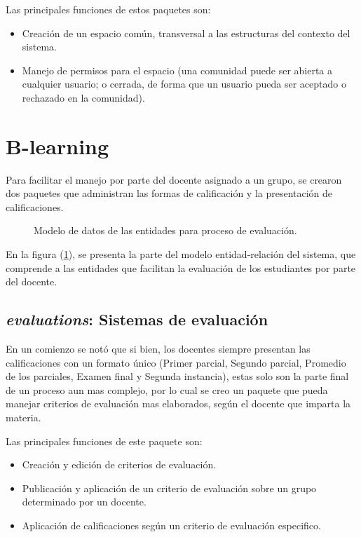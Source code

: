 Las principales funciones de estos paquetes son:

\begin{itemize}
\item Creación de un espacio común, transversal a las estructuras del contexto
del sistema.
\item Manejo de permisos para el espacio (una comunidad puede ser abierta a
cualquier usuario; o cerrada, de forma que un usuario pueda ser aceptado o
rechazado en la comunidad).
\end{itemize}

\section{B-learning}
Para facilitar el manejo por parte del docente asignado a un grupo, se crearon
dos paquetes que administran las formas de calificación y la presentación de
calificaciones.

\begin{figure}
\centering

\caption{Modelo de datos de las entidades para proceso de evaluación.}
\label{modelo3}
\end{figure}

En la figura (\ref{modelo3}), se presenta la parte del modelo entidad-relación
del sistema, que comprende a las entidades que facilitan la evaluación de los
estudiantes por parte del docente.

\subsection{\emph{evaluations}: Sistemas de evaluación}
En un comienzo se notó que si bien, los docentes siempre presentan las
calificaciones con un formato único (Primer parcial, Segundo parcial, Promedio
de los parciales, Examen final y Segunda instancia), estas solo son la parte
final de un proceso aun mas complejo, por lo cual se creo un paquete que pueda
manejar criterios de evaluación mas elaborados, según el docente que imparta la
materia.

Las principales funciones de este paquete son:

\begin{itemize}
\item Creación y edición de criterios de evaluación.
\item Publicación y aplicación de un criterio de evaluación sobre un grupo
determinado por un docente.
\item Aplicación de calificaciones según un criterio de evaluación especifico.
\end{itemize}

